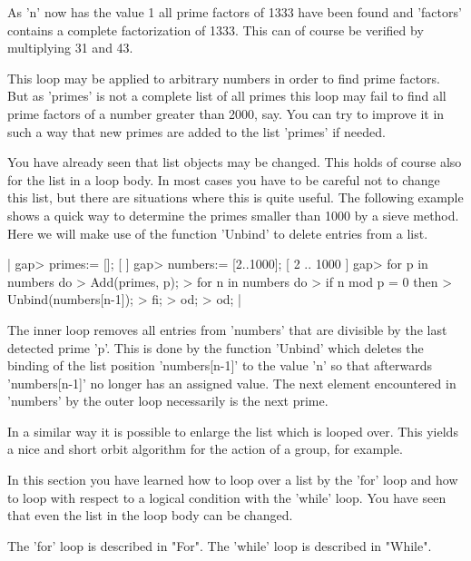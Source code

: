 As 'n' now has the value 1 all prime factors  of 1333 have been found and
'factors' contains a complete factorization of  1333.  This can of course
be verified by multiplying 31 and 43.

This loop  may  be applied  to arbitrary  numbers in order  to find prime
factors.  But  as 'primes' is not a complete list of all primes this loop
may fail  to find all prime factors of  a number greater than 2000,  say.
You  can try to improve it in such a way that new primes are added to the
list 'primes' if needed.

You have already seen that list objects may be  changed.   This holds  of
course also for the  list in a loop body.  In most  cases  you have to be
careful not  to change this list, but there are situations  where this is
quite useful.  The following example  shows a quick way  to determine the
primes smaller than 1000 by a sieve method.  Here we will make use of the
function 'Unbind' to delete entries from a list.

|    gap> primes:= [];
    [  ]
    gap> numbers:= [2..1000];
    [ 2 .. 1000 ]
    gap> for p in numbers do
    >       Add(primes, p);
    >       for n in numbers do
    >          if n mod p = 0 then
    >             Unbind(numbers[n-1]);
    >          fi;
    >       od;
    >    od; |

The inner loop  removes all entries from 'numbers' that are  divisible by
the last detected prime 'p'.  This is done by the function 'Unbind' which
deletes the binding of the list position  'numbers[n-1]' to the value 'n'
so that afterwards 'numbers[n-1]' no longer has  an  assigned value.  The
next  element encountered in 'numbers'  by the outer  loop necessarily is
the next prime.

In a similar way it is possible to enlarge the list which is looped over.
This yields a nice and short orbit  algorithm for the  action of a group,
for example.

In this section  you have learned how  to loop over a  list by the  'for'
loop and how to loop with respect to a logical condition with the 'while'
loop.  You have seen that even the list in the loop body can be changed.

The  'for' loop is described in "For".  The 'while'  loop is described in
"While".


